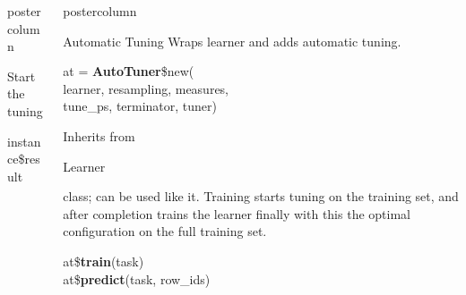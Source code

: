 \documentclass{beamer}
\newlength{\columnheight} %
\newcommand{\codeinline}[1]{\begin{codeboxinline}#1\end{codeboxinline}}
\begin{document}
\begin{frame}[fragile]{}
\begin{columns}
\begin{column}{.245\textwidth}
\begin{beamercolorbox}[center]{postercolumn}
\begin{minipage}{.98\textwidth}
{\begin{myblock}{Start the tuning}
\begin{codeboxexample}
{									instance\$result
								}
							\end{codeboxexample}
						\end{myblock}
						\vfill}
				\end{minipage}
			\end{beamercolorbox}
		\end{column}
		\begin{column}{.245\textwidth}
			\begin{beamercolorbox}[center]{postercolumn}
				\begin{minipage}{.98\textwidth}
					\parbox[t][\columnheight]{\textwidth}{
						\begin{myblock}{Automatic Tuning}
							Wraps learner and adds automatic tuning. 
							\\
							\begin{codeboxmultiline}[width=20cm]
								at = \textbf{AutoTuner}\$new(\\
								\hspace*{1ex}learner, resampling, measures, \\
								\hspace*{1ex}tune\_ps, terminator, tuner)
							\end{codeboxmultiline}
							\vspace{1em}
                            Inherits from \codeinline{Learner} class; can be used like it. Training starts tuning on the training set, and after completion trains the learner finally with this the optimal configuration on the full training set.
							\begin{codeboxmultiline}
								at\$\textbf{train}(task)\\
								at\$\textbf{predict}(task, row\_ids)
							\end{codeboxmultiline}

\end{myblock}}
\end{minipage}
\end{beamercolorbox}
\end{column}
\end{columns}
\end{frame}
\end{document}
